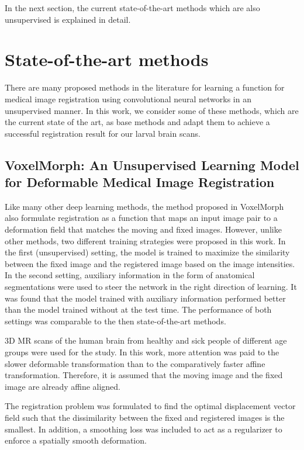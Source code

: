 \documentclass{book}
\begin{document}
	In the next section, the current state-of-the-art methods which are also unsupervised is explained in detail.
	
	\section{State-of-the-art methods}
	There are many proposed methods in the literature for learning a function for medical image registration using convolutional neural networks in an unsupervised manner. In this work, we consider some of these methods, which are the current state of the art, as base methods and adapt them to achieve a successful registration result for our larval brain scans.
	
	\subsection{VoxelMorph: An Unsupervised Learning Model for Deformable Medical Image Registration} 
	Like many other deep learning methods, the method proposed in VoxelMorph \cite{8579062} \cite{Balakrishnan_2019} also formulate registration as a function that maps an input image pair to a deformation field that matches the moving and fixed images. However, unlike other methods, two different training strategies were proposed in this work. In the first (unsupervised) setting, the model is trained to maximize the similarity between the fixed image and the registered image based on the image intensities. In the second setting, auxiliary information in the form of anatomical segmentations were used to steer the network in the right direction of learning. It was found that the model trained with auxiliary information performed better than the model trained without at the test time. The performance of both settings was comparable to the then state-of-the-art methods.
	
	3D MR scans of the human brain from healthy and sick people of different age groups were used for the study. In this work, more attention was paid to the slower deformable transformation than to the comparatively faster affine transformation. Therefore, it is assumed that the moving image and the fixed image are already affine aligned.
	
	The registration problem was formulated to find the optimal displacement vector field such that the dissimilarity between the fixed and registered images is the smallest. In addition, a smoothing loss was included to act as a regularizer to enforce a spatially smooth deformation.
	
\end{document}
